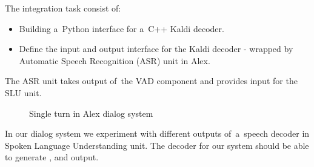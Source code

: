 The integration task consist of:
\begin{itemize}
    \item Building a~Python interface for a~C++ Kaldi decoder.
    \item Define the input and output interface for the Kaldi decoder - wrapped by Automatic Speech Recognition (ASR) unit in Alex.
\end{itemize}
 The ASR unit takes output of~the VAD component and provides input for the SLU unit. 

\begin{figure}
    \begin{center}
    
    \caption{Single turn in Alex dialog system}
    \label{fig:dialog_system} 
    \end{center}
\end{figure}

In our dialog system we experiment with different outputs of~a~speech decoder in Spoken Language Understanding unit. 
The decoder for our system should be able to generate ,  and  output.




% 
% 

